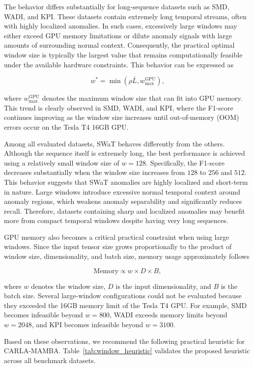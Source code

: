 \documentclass[runningheads]{llncs}
\begin{document}
The behavior differs substantially for long-sequence datasets such as SMD, WADI, and KPI. These datasets contain extremely long temporal streams, often with highly localized anomalies. In such cases, excessively large windows may either exceed GPU memory limitations or dilute anomaly signals with large amounts of surrounding normal context. Consequently, the practical optimal window size is typically the largest value that remains computationally feasible under the available hardware constraints. This behavior can be expressed as

\[
w^* = \min(\rho \bar{L}, w_{\max}^{\text{GPU}}),
\]

where $w_{\max}^{\text{GPU}}$ denotes the maximum window size that can fit into GPU memory. This trend is clearly observed in SMD, WADI, and KPI, where the F1-score continues improving as the window size increases until out-of-memory (OOM) errors occur on the Tesla T4 16GB GPU.

Among all evaluated datasets, SWaT behaves differently from the others. Although the sequence itself is extremely long, the best performance is achieved using a relatively small window size of $w=128$. Specifically, the F1-score decreases substantially when the window size increases from $128$ to $256$ and $512$. This behavior suggests that SWaT anomalies are highly localized and short-term in nature. Large windows introduce excessive normal temporal context around anomaly regions, which weakens anomaly separability and significantly reduces recall. Therefore, datasets containing sharp and localized anomalies may benefit more from compact temporal windows despite having very long sequences.

GPU memory also becomes a critical practical constraint when using large windows. Since the input tensor size grows proportionally to the product of window size, dimensionality, and batch size, memory usage approximately follows

\[
\text{Memory} \propto w \times D \times B,
\]

where $w$ denotes the window size, $D$ is the input dimensionality, and $B$ is the batch size. Several large-window configurations could not be evaluated because they exceeded the 16GB memory limit of the Tesla T4 GPU. For example, SMD becomes infeasible beyond $w=800$, WADI exceeds memory limits beyond $w=2048$, and KPI becomes infeasible beyond $w=3100$.

Based on these observations, we recommend the following practical heuristic for CARLA-MAMBA. Table~\ref{tab:window_heuristic} validates the proposed heuristic across all benchmark datasets.
\end{document}
